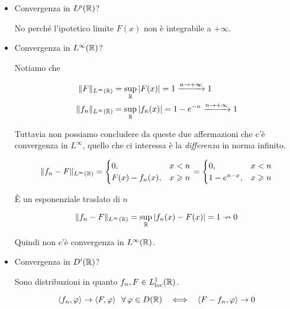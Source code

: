 \begin{itemize}
\item Convergenza in $L^{p}(\mathbb{R} )$?

No perché l'ipotetico limite $F( x)$ non è integrabile a $+\infty $.
\item Convergenza in $L^{\infty }(\mathbb{R} )$?

Notiamo che

\begin{equation*}
\begin{aligned}
\Vert F\Vert _{L^{\infty }(\mathbb{R} )} & =\sup _{\mathbb{R} }| F( x)| =1\xrightarrow{n\rightarrow +\infty } 1\\
\Vert f_{n}\Vert _{L^{\infty }(\mathbb{R} )} & =\sup _{\mathbb{R} }| f_{n}( x)| =1-e^{-n}\xrightarrow{n\rightarrow +\infty } 1
\end{aligned}
\end{equation*}

Tuttavia non possiamo concludere da queste due affermazioni che c'è convergenza in $L^{\infty }$, quello che ci interessa è la \textit{differenza} in norma infinito.

\begin{equation*}
\Vert f_{n} -F\Vert _{L^{\infty }(\mathbb{R} )} =\begin{cases}
0, & x< n\\
F( x) -f_{n}( x) , & x\geqslant n
\end{cases} =\begin{cases}
0, & x< n\\
1-e^{n-x} , & x\geqslant n
\end{cases}
\end{equation*}

È un esponenziale traslato di $n$

\begin{equation*}
\Vert f_{n} -F\Vert _{L^{\infty }(\mathbb{R} )} =\sup _{\mathbb{R} }| f_{n}( x) -F( x)| =1\nrightarrow 0
\end{equation*}

Quindi non c'è convergenza in $L^{\infty }(\mathbb{R} )$.
\item Convergenza in $D'(\mathbb{R} )$?

Sono distribuzioni in quanto $f_{n} ,F\in L^{1}_{\mathrm{loc}}(\mathbb{R} )$.

\begin{equation*}
\langle f_{n} ,\varphi \rangle \rightarrow \langle F,\varphi \rangle \ \ \forall \varphi \in D(\RR ) \ \ \iff \ \ \langle F-f_{n} ,\varphi \rangle \rightarrow 0
\end{equation*}


\end{itemize}
